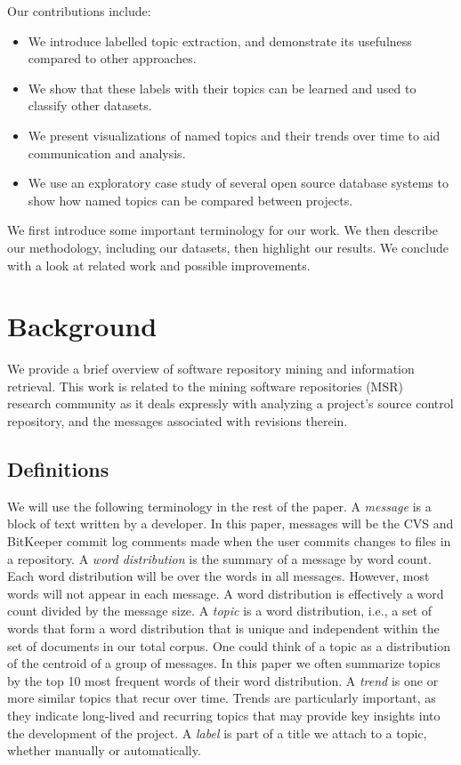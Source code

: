 \documentclass{acm_proc_article-sp}
\begin{document}
Our contributions include:
\begin{itemize}
\item  We introduce labelled topic extraction, and demonstrate its usefulness
  compared to other approaches.
\item We show that these labels with their topics can be learned and used to classify other datasets.
\item We present visualizations of named topics and their trends over time to aid communication and analysis.
\item We use an exploratory case study of
  several open source database systems to show how named topics can be compared between projects.
\end{itemize}

We first introduce some important terminology for our work. We then describe our methodology, including our datasets, then highlight our results. We conclude with a look at related work and possible improvements.

\section{Background}

We provide a brief overview of software repository mining and information retrieval.
This work is related to the mining software repositories (MSR)~\cite{msr} research community as it deals expressly with analyzing a project's source control repository, and the messages associated with revisions therein.


\subsection{Definitions}
We will use the following terminology in the rest of the paper.
A \emph{message} is a block of text written by a developer. In this
paper, messages will be the CVS and BitKeeper commit log comments made
when the user commits changes to files in a repository. A \emph{word
  distribution} is the summary of a message by word count. Each word
distribution will be over the words in all messages. However, most
words will not appear in each message. A word distribution is effectively
a word count divided by the message size. A \emph{topic} is a word
distribution, i.e., a set of words that form a word distribution that is
unique and independent within the set of documents in our total
corpus. One could think of a topic as a distribution of the centroid
of a group of messages. In this paper we often summarize topics by the
top 10 most frequent words of their word distribution.  A \emph{trend}
is one or more similar topics that recur over time.  Trends are
particularly important, as they indicate long-lived and recurring
topics that may provide key insights into the development of the
project. A \emph{label} is part of a title we attach to a topic, whether manually or automatically.
\end{document}
